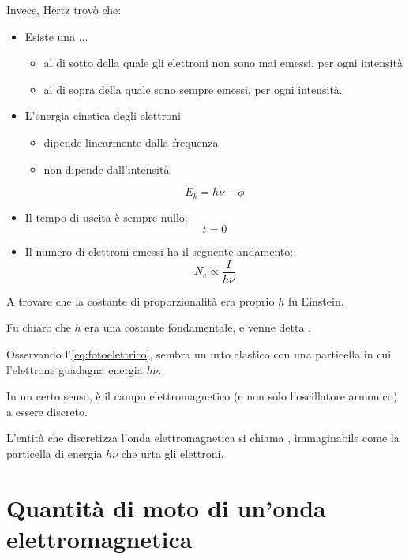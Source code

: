 Invece, Hertz trovò che:
\begin{itemize}
    \item Esiste una ...
    \begin{itemize}
        \item al di sotto della quale gli elettroni non sono mai emessi, per ogni intensità
        \item al di sopra della quale sono sempre emessi, per ogni intensità.
    \end{itemize}
    \item L'energia cinetica degli elettroni
    \begin{itemize}
        \item dipende linearmente dalla frequenza
        \item non dipende dall'intensità
    \end{itemize}
        \begin{equation}
        \label{eq:fotoelettrico}
            E_k = h \nu - \phi
        \end{equation}
    \item Il tempo di uscita è sempre nullo:
        \begin{equation}
            t = 0
        \end{equation}
    \item Il numero di elettroni emessi ha il seguente andamento:
        \begin{equation}
            N_e \propto \frac{I}{h \nu}
        \end{equation}
\end{itemize}

A trovare che la costante di proporzionalità era proprio $h$ fu Einstein.

Fu chiaro che $h$ era una costante fondamentale, e venne detta .

Osservando l'\cref{eq:fotoelettrico}, sembra un urto elastico con una particella in cui l'elettrone guadagna energia $h \nu$.

In un certo senso, è il campo elettromagnetico (e non solo l'oscillatore armonico) a essere discreto.

L'entità che discretizza l'onda elettromagnetica si chiama , immaginabile come la particella di energia $h \nu$ che urta gli elettroni.

\section{Quantità di moto di un'onda elettromagnetica}

